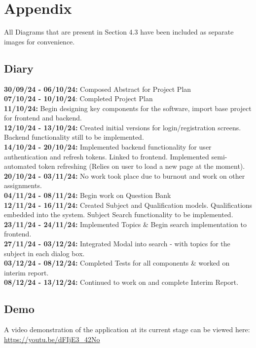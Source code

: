 \documentclass[]{final_report}
\begin{document}
\chapter*{Appendix}

All Diagrams that are present in Section 4.3 have been included as separate images for convenience.

\section*{Diary}

\textbf{30/09/24 - 06/10/24:} Composed Abstract for Project Plan\\

\textbf{07/10/24 - 10/10/24}: Completed Project Plan\\

\textbf{11/10/24:} Begin designing key components for the software, import base project for frontend and backend.\\

\textbf{12/10/24 - 13/10/24:} Created initial versions for login/registration screens. Backend functionality still to be implemented. \\

\textbf{14/10/24 - 20/10/24:} Implemented backend functionality for user authentication and refresh tokens. Linked to frontend. Implemented semi-automated token refreshing (Relies on user to load a new page at the moment).\\

\textbf{20/10/24 - 03/11/24:} No work took place due to burnout and work on other assignments.\\

\textbf{04/11/24 - 08/11/24:} Begin work on Question Bank\\

\textbf{12/11/24 - 16/11/24:} Created Subject and Qualification models. Qualifications embedded into the system. Subject Search functionality to be implemented.\\

\textbf{23/11/24 - 24/11/24:} Implemented Topics \& Begin search implementation to frontend.\\

\textbf{27/11/24 - 03/12/24:} Integrated Modal into search - with topics for the subject in each dialog box.\\

\textbf{03/12/24 - 08/12/24:} Completed Tests for all components \& worked on interim report.\\

\textbf{08/12/24 - 13/12/24:} Continued to work on and complete Interim Report.\\

\section*{Demo}
A video demonstration of the application at its current stage can be viewed here: \url{https://youtu.be/dFIjE3_42No}
\end{document}
